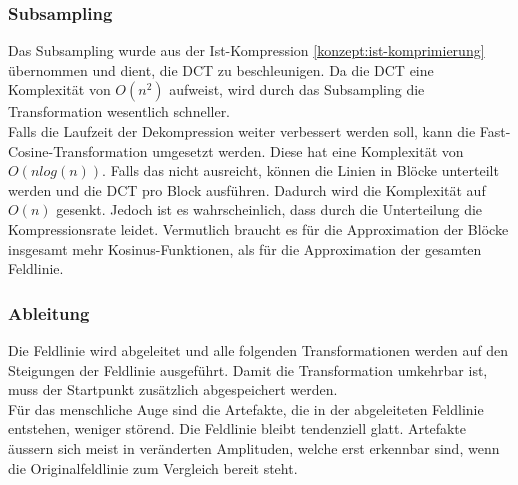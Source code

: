 \subsubsection{Subsampling} \label{konzept:loesung1:subsampling}
Das Subsampling wurde aus der Ist-Kompression \ref{konzept:ist-komprimierung} übernommen und dient, die DCT zu beschleunigen. Da die DCT eine Komplexität von $O(n^2)$ aufweist, wird durch das Subsampling die Transformation wesentlich schneller.\\
Falls die Laufzeit der Dekompression weiter verbessert werden soll, kann die Fast-Cosine-Transformation umgesetzt werden. Diese hat eine Komplexität von $O(n log(n))$. Falls das nicht ausreicht, können die Linien in Blöcke unterteilt werden und die DCT pro Block ausführen. Dadurch wird die Komplexität auf $O(n)$ gesenkt. Jedoch ist es wahrscheinlich, dass durch die Unterteilung die Kompressionsrate leidet. Vermutlich braucht es für die Approximation der Blöcke insgesamt mehr Kosinus-Funktionen, als für die Approximation der gesamten Feldlinie.

\subsubsection{Ableitung}
Die Feldlinie wird abgeleitet und alle folgenden Transformationen werden auf den Steigungen der Feldlinie ausgeführt. Damit die Transformation umkehrbar ist, muss der Startpunkt zusätzlich abgespeichert werden.\\
Für das menschliche Auge sind die Artefakte, die in der abgeleiteten Feldlinie entstehen, weniger störend. Die Feldlinie bleibt tendenziell glatt. Artefakte äussern sich meist in veränderten Amplituden, welche erst erkennbar sind, wenn die Originalfeldlinie zum Vergleich bereit steht.

